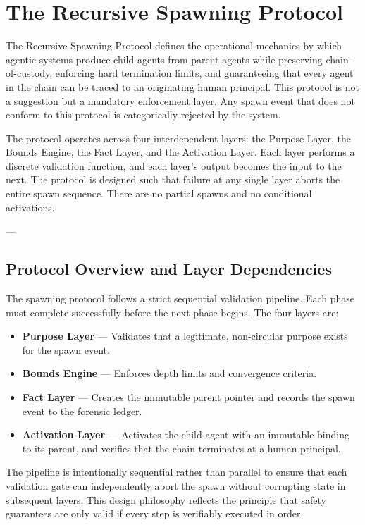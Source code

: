 \section{The Recursive Spawning Protocol}

The Recursive Spawning Protocol defines the operational mechanics by which agentic systems produce child agents from parent agents while preserving chain-of-custody, enforcing hard termination limits, and guaranteeing that every agent in the chain can be traced to an originating human principal. This protocol is not a suggestion but a mandatory enforcement layer. Any spawn event that does not conform to this protocol is categorically rejected by the system.

The protocol operates across four interdependent layers: the Purpose Layer, the Bounds Engine, the Fact Layer, and the Activation Layer. Each layer performs a discrete validation function, and each layer's output becomes the input to the next. The protocol is designed such that failure at any single layer aborts the entire spawn sequence. There are no partial spawns and no conditional activations.

---

\subsection{Protocol Overview and Layer Dependencies}

The spawning protocol follows a strict sequential validation pipeline. Each phase must complete successfully before the next phase begins. The four layers are:

\begin{itemize}
    \item \textbf{Purpose Layer} — Validates that a legitimate, non-circular purpose exists for the spawn event.
    \item \textbf{Bounds Engine} — Enforces depth limits and convergence criteria.
    \item \textbf{Fact Layer} — Creates the immutable parent pointer and records the spawn event to the forensic ledger.
    \item \textbf{Activation Layer} — Activates the child agent with an immutable binding to its parent, and verifies that the chain terminates at a human principal.
\end{itemize}

The pipeline is intentionally sequential rather than parallel to ensure that each validation gate can independently abort the spawn without corrupting state in subsequent layers. This design philosophy reflects the principle that safety guarantees are only valid if every step is verifiably executed in order.

